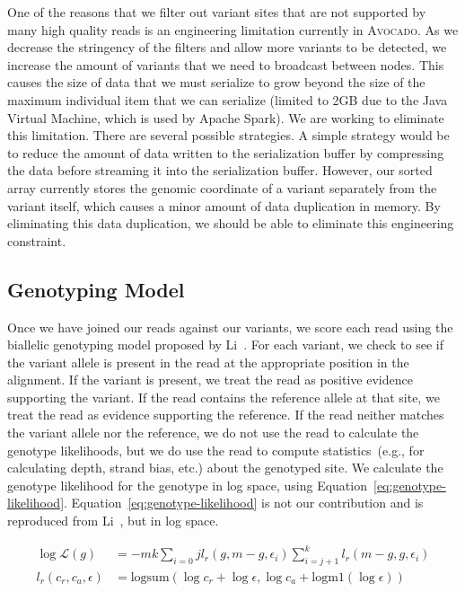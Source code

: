 \documentclass[phd]{ucbthesis}
\begin{document}
One of the reasons that we filter out variant sites that are not supported
by many high quality reads is an engineering limitation currently in
\textsc{Avocado}. As we decrease the stringency of the filters and allow
more variants to be detected, we increase the amount of variants that we
need to broadcast between nodes. This causes the size of data that we
must serialize to grow beyond the size of the maximum individual item
that we can serialize (limited to 2GB due to the Java Virtual Machine, which
is used by Apache Spark).
We are working to eliminate this limitation. There are several possible
strategies. A simple strategy would be to reduce the amount of data written
to the serialization buffer by compressing the data before streaming it
into the serialization buffer. However, our sorted array currently
stores the genomic coordinate of a variant separately from the variant
itself, which causes a minor amount of data duplication in memory. By
eliminating this data duplication, we should be able to eliminate this
engineering constraint.

\subsection{Genotyping Model}
\label{sec:genotyping-model}

Once we have joined our reads against our variants, we score each read using
the biallelic genotyping model proposed by Li~\cite{li11}. For each variant, we
check to see if the variant allele is present in the read at the appropriate
position in the alignment. If the variant is present, we treat the read as positive
evidence supporting the variant. If the read contains the reference allele at
that site, we treat the read as evidence supporting the reference. If the read
neither matches the variant allele nor the reference, we do not use the read
to calculate the genotype likelihoods, but we do use the read to compute
statistics~(e.g., for calculating depth, strand bias, etc.) about the genotyped
site. We calculate the genotype likelihood for the genotype in log space, using
Equation~\eqref{eq:genotype-likelihood}. Equation~\eqref{eq:genotype-likelihood}
is not our contribution and is reproduced from Li~\cite{li11}, but in log space.

\begin{align}
\label{eq:genotype-likelihood}
\log \mathcal{L}(g) &= -m k \sum_{i = 0}{j} l_r(g, m - g, \epsilon_i) \sum_{i = j + 1}^k l_r(m - g, g, \epsilon_i) \\
l_r(c_r, c_a, \epsilon) &= \text{logsum}(\log c_r + \log \epsilon, \log c_a + \text{logm1}(\log \epsilon))
\end{align}
\end{document}

